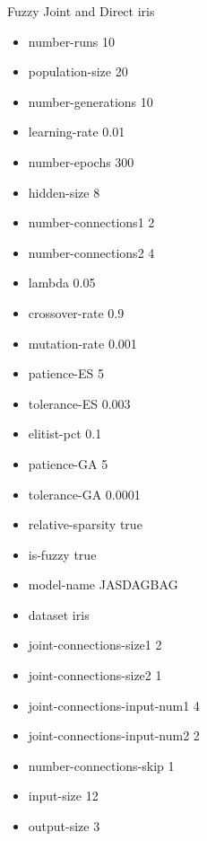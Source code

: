 Fuzzy Joint and Direct
iris
\begin{itemize}
\item number-runs 10
\item population-size 20
\item number-generations 10
\item learning-rate 0.01
\item number-epochs 300
\item hidden-size 8
\item number-connections1 2
\item number-connections2 4
\item lambda 0.05
\item crossover-rate 0.9
\item mutation-rate 0.001
\item patience-ES 5
\item tolerance-ES 0.003
\item elitist-pct 0.1
\item patience-GA 5
\item tolerance-GA 0.0001
\item relative-sparsity true
\item is-fuzzy true
\item model-name JASDAGBAG
\item dataset iris
\item joint-connections-size1 2
\item joint-connections-size2 1
\item joint-connections-input-num1 4
\item joint-connections-input-num2 2
\item number-connections-skip 1
\item input-size 12
\item output-size 3
\end{itemize}

